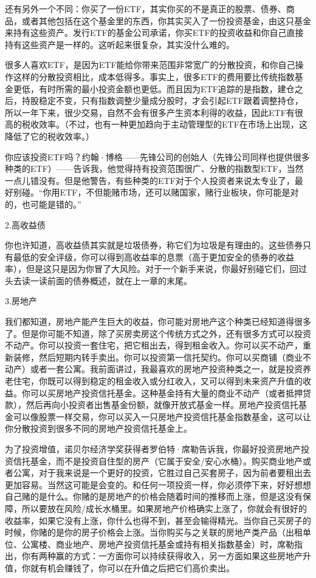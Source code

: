 还有另外一个不同：你买了一份ETF，其实你买的不是真正的股票、债券、商品，或者其他包括在这个基金里的东西，你其实买入了一份投资基金，由这只基金来持有这些资产。发行ETF的基金公司承诺，你买ETF的投资收益和你自己直接持有这些资产是一样的。这听起来很复杂，其实没什么难的。

很多人喜欢ETF，是因为ETF能给你带来范围非常宽广的分散投资，和你自己操作这样的分散投资相比，成本低得多。事实上，很多ETF的费用要比传统指数基金更低，有时所需的最小投资金额也更低。而且因为ETF追踪的是指数，建仓之后，持股稳定不变，只有指数调整少量成分股时，才会引起ETF跟着调整持仓，所以一年下来，很少交易，自然不会有很多产生资本利得的收益，因此ETF有很高的税收效率。（不过，也有一种更加趋向于主动管理型的ETF在市场上出现，这降低了它的税收效率。）

你应该投资ETF吗？约翰·博格——先锋公司的创始人（先锋公司同样也提供很多种类的ETF）——告诉我，他觉得持有投资范围很广、分散的指数型ETF，当然一点儿错没有。但是他警告，有些种类的ETF对于个人投资者来说太专业了，最好别碰。“你用ETF，不但能赌市场，还可以赌国家，赌行业板块，你可能是对的，也可能是错的。”

2.高收益债

你也许知道，高收益债其实就是垃圾债券，称它们为垃圾是有理由的。这些债券只有最低的安全评级，你可以得到高收益率的息票（高于更加安全的债券的收益率），但是这只是因为你冒了大风险。对于一个新手来说，你最好别碰它们，回过头去读一读前面的债券概述，就在上一章的末尾。

3.房地产

我们都知道，房地产能产生巨大的收益，你可能对房地产这个种类已经知道得很多了。但是你可能不知道，除了买房卖房这个传统方式之外，还有很多方式可以投资不动产。你可以投资一套住宅，把它租出去，得到租金收入。你可以买不动产，重新装修，然后短期内转手卖出。你可以投资第一信托契约。你可以买商铺（商业不动产）或者一套公寓。我前面讲过，我最喜欢的房地产投资种类之一，就是投资养老住宅，你既可以得到稳定的租金收入或分红收入，又可以得到未来资产升值的收益。你可以买房地产投资信托基金。这种基金持有大量的商业不动产（或者抵押贷款），然后再向小投资者出售基金份额，就像开放式基金一样。房地产投资信托基金可以像股票一样交易，你可以买入一只房地产投资信托基金指数基金，这可以让你分散投资到很多不同的房地产投资信托基金上。

为了投资增值，诺贝尔经济学奖获得者罗伯特·席勒告诉我，你最好投资房地产投资信托基金，而不是投资自住型的房产（它属于安全/安心水桶）。购买商业地产或者公寓，对于我来说是一个更好的投资，它胜过自己买套房子，因为前者要租出去更加容易。当然这可能是会变的。和任何一项投资一样，你必须停下来，好好想想自己赌的是什么。你赌的是房地产的价格会随着时间的推移而上涨，但是这没有保障，所以要放在风险/成长水桶里。如果房地产价格确实上涨了，你就会有很好的收益率，如果它没有上涨，你什么也得不到，甚至会输得精光。当你自己买房子的时候，你赌的是你的房子价格会上涨。当你购买与之关联的房地产类产品（出租单位、公寓楼、商业地产、房地产投资信托基金或持有相关指数基金）时，席勒指出，你有两种赢的方式：一方面你可以持续获得收入，另一方面如果这些房地产升值，你就有机会赚钱了，你可以在升值之后把它们高价卖出。

